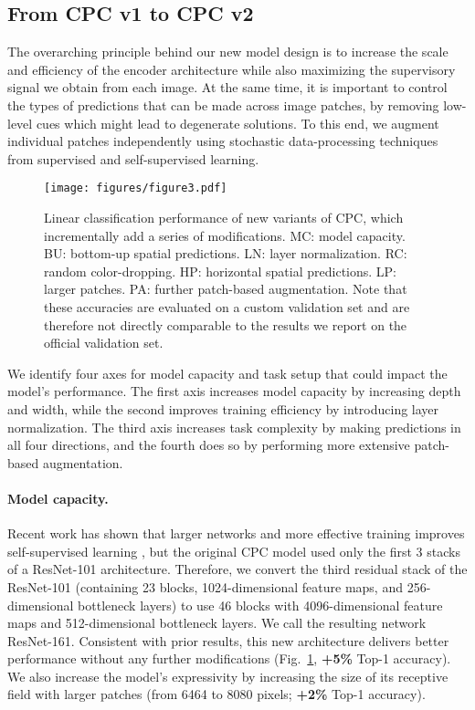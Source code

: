 \documentclass{article}
\begin{document}
\subsection{From CPC v1 to CPC v2}
\label{sec:experiments-linear}
The overarching principle behind our new model design is to increase the scale and efficiency of the encoder architecture while also maximizing the supervisory signal we obtain from each image.  At the same time, it is important to control the types of predictions that can be made across image patches, by removing low-level cues which might lead to degenerate solutions. To this end, we augment individual patches independently using stochastic data-processing techniques from supervised and self-supervised learning. 

\begin{figure}
\centering
    \texttt{[image: figures/figure3.pdf]}
    \vspace{-2em}
   \caption{Linear classification performance of new variants of CPC, which incrementally add a series of modifications. MC: model capacity. BU: bottom-up spatial predictions. LN: layer normalization. RC: random color-dropping. HP: horizontal spatial predictions. LP: larger patches. PA: further patch-based augmentation. Note that these accuracies are evaluated on a custom validation set and are therefore not directly comparable to the results we report on the official validation set.}
    \vspace{-1em}
\label{fig:linear_class}
\end{figure}

We identify four axes for model capacity and task setup that could impact the model's performance. The first axis increases model capacity by increasing depth and width, while the second improves training efficiency by introducing layer normalization. The third axis increases task complexity by making predictions in all four directions, and the fourth does so by performing more extensive patch-based augmentation.

\paragraph{Model capacity.} Recent work has shown that larger networks and more effective training improves self-supervised learning \citep{doersch2017multi, kolesnikov2019revisiting}, but the original CPC model used only the first 3 stacks of a ResNet-101 architecture.  Therefore, we convert the third residual stack of the  ResNet-101 (containing 23 blocks, 1024-dimensional feature maps, and 256-dimensional bottleneck layers) to use 46 blocks with 4096-dimensional feature maps and 512-dimensional bottleneck layers.  We call the resulting network ResNet-161. Consistent with prior results, this new architecture delivers better performance without any further modifications (Fig.\ \ref{fig:linear_class}, \textbf{+5\%} Top-1 accuracy). We also increase the model's expressivity by increasing the size of its receptive field with larger patches (from 6464 to 8080 pixels; \textbf{+2\%} Top-1 accuracy). 
\end{document}
